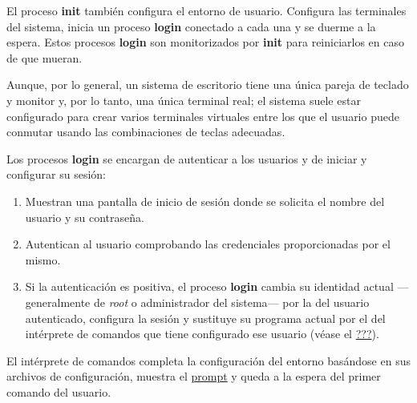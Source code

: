 El proceso \textbf{init} también configura el entorno de usuario.
Configura las terminales del sistema, inicia un proceso \textbf{login}
conectado a cada una y se duerme a la espera. Estos procesos
\textbf{login} son monitorizados por \textbf{init} para reiniciarlos en
caso de que mueran.

Aunque, por lo general, un sistema de escritorio tiene una única pareja
de teclado y monitor y, por lo tanto, una única terminal real; el
sistema suele estar configurado para crear varios terminales virtuales
entre los que el usuario puede conmutar usando las combinaciones de
teclas adecuadas.

Los procesos \textbf{login} se encargan de autenticar a los usuarios y
de iniciar y configurar su sesión:

\begin{enumerate}
\def\labelenumi{\arabic{enumi}.}
\item
  Muestran una pantalla de inicio de sesión donde se solicita el nombre
  del usuario y su contraseña.
\item
  Autentican al usuario comprobando las credenciales proporcionadas por
  el mismo.
\item
  Si la autenticación es positiva, el proceso \textbf{login} cambia su
  identidad actual ---generalmente de \emph{root} o administrador del
  sistema--- por la del usuario autenticado, configura la sesión y
  sustituye su programa actual por el del intérprete de comandos que
  tiene configurado ese usuario (véase el
  \hyperref[sect-procesos-posix-api]{???}).
\end{enumerate}

El intérprete de comandos completa la configuración del entorno
basándose en sus archivos de configuración, muestra el
\href{https://es.wikipedia.org/wiki/Prompt}{prompt} y queda a la espera
del primer comando del usuario.
